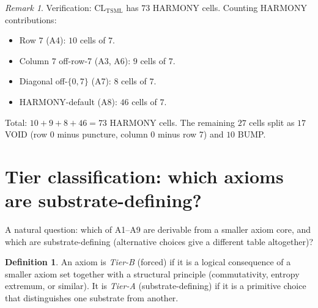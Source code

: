 \documentclass[11pt,reqno]{amsart}
\theoremstyle{plain}
\theoremstyle{definition}
\newtheorem{definition}[theorem]{Definition}
\theoremstyle{remark}
\newtheorem*{remark}{Remark}
\newcommand{\TSML}{\mathrm{TSML}}
\begin{document}
\begin{remark}\label{rem:counts}
Verification: $\mathrm{CL}_\TSML$ has $73$ HARMONY cells. Counting
HARMONY contributions:
\begin{itemize}
\item Row $7$ (A4): $10$ cells of $7$.
\item Column $7$ off-row-7 (A3, A6): $9$ cells of $7$.
\item Diagonal off-$\{0,7\}$ (A7): $8$ cells of $7$.
\item HARMONY-default (A8): $46$ cells of $7$.
\end{itemize}
Total: $10 + 9 + 8 + 46 = 73$ HARMONY cells. The remaining $27$ cells
split as $17$ VOID (row 0 minus puncture, column 0 minus row 7) and
$10$ BUMP.
\end{remark}

\section{Tier classification: which axioms are substrate-defining?}
\label{sec:tiering}

A natural question: which of A1--A9 are derivable from a smaller axiom
core, and which are substrate-defining (alternative choices give a
different table altogether)?

\begin{definition}\label{def:tier}
An axiom is \emph{Tier-B} (forced) if it is a logical consequence of
a smaller axiom set together with a structural principle (commutativity,
entropy extremum, or similar). It is \emph{Tier-A} (substrate-defining)
if it is a primitive choice that distinguishes one substrate from
another.
\end{definition}
\end{document}
